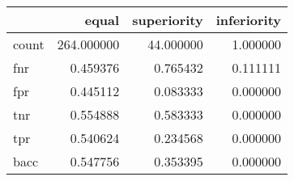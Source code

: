 \begin{tabular}{lrrr}
\toprule
{} &       equal &  superiority &  inferiority \\
\midrule
count &  264.000000 &    44.000000 &     1.000000 \\
fnr   &    0.459376 &     0.765432 &     0.111111 \\
fpr   &    0.445112 &     0.083333 &     0.000000 \\
tnr   &    0.554888 &     0.583333 &     0.000000 \\
tpr   &    0.540624 &     0.234568 &     0.000000 \\
bacc  &    0.547756 &     0.353395 &     0.000000 \\
\bottomrule
\end{tabular}
